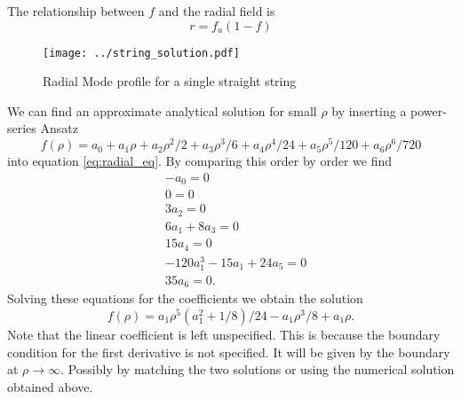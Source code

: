 \documentclass[a4paper]{article}
\begin{document}
The relationship between $f$ and the radial field is
\begin{equation}
	r = f_a (1 - f)
\end{equation}

\begin{figure}[H]
	\texttt{[image: ../string\_solution.pdf]}
	\caption{Radial Mode profile for a single straight string}
\end{figure}

We can find an approximate analytical solution for small $\rho$ by inserting a power-series Ansatz
\begin{equation}
	f(\rho) = 
	a_0 + a_1 \rho + a_2 \rho^2/2 + a_3 \rho^3/6 + a_4 \rho^4/24 + a_5 \rho^5/120 + a_6 \rho^6/720	
\end{equation}
into equation \eqref{eq:radial_eq}.
By comparing this order by order we find
\begin{align}
	&-a_0 = 0 \\
	&0 = 0 \\
	&3 a_2 = 0 \\
	&6 a_1 + 8 a_3 = 0\\
	&15a_4 = 0\\
	&-120 a_1^3 - 15a_1 + 24a_5 = 0\\
	&35 a_6 = 0.
\end{align}
Solving these equations for the coefficients we obtain the 
solution
\begin{equation}
	f(\rho) = a_1\rho^5(a_1^2 + 1/8)/24 - a_1\rho^3/8 + a_1\rho.
\end{equation}
Note that the linear coefficient is left unspecified.
This is because the boundary condition for the first derivative is not specified.
It will be given by the boundary at $\rho \to \infty$. Possibly by matching the two solutions or using the numerical solution obtained above.
\end{document}
